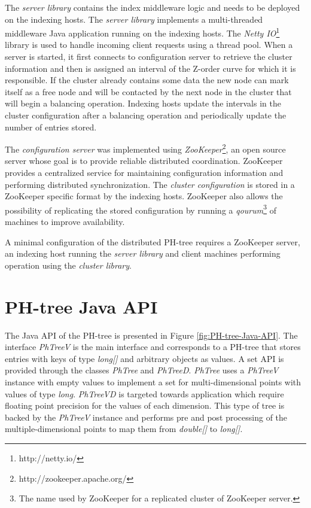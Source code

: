 \documentclass[11pt,a4paper]{globis-book}
\begin{document}
The \textit{server library} contains the index middleware logic and needs to be deployed on the indexing hosts. The \textit{server library} implements a multi-threaded middleware Java application running on the indexing hosts. The \textit{Netty IO}\footnote{http://netty.io/} library is used to handle incoming client requests using a thread pool. When a server is started, it first connects to configuration server to retrieve the cluster information and then is assigned an interval of the Z-order curve for which it is responsible. If the cluster already contains some data the new node can mark itself as a free node and will be contacted by the next node in the cluster that will begin a balancing operation. Indexing hosts update the intervals in the cluster configuration after a balancing operation and periodically update the number of entries stored. 

The \textit{configuration server} was implemented using \textit{ZooKeeper}\footnote{http://zookeeper.apache.org/}, an open source server whose goal is to provide reliable distributed coordination. ZooKeeper provides a centralized service for maintaining configuration information and performing distributed synchronization. The \textit{cluster configuration} is stored in a ZooKeeper specific format by the indexing hosts. ZooKeeper also allows the possibility of replicating the stored configuration by running a \textit{qourum}\footnote{The name used by ZooKeeper for a replicated cluster of ZooKeeper server.} of machines to improve availability. 

A minimal configuration of the distributed PH-tree requires a ZooKeeper server, an indexing host running the \textit{server library} and client machines performing operation using the \textit{cluster library}.

\section{PH-tree Java API}

The Java API of the PH-tree is presented in Figure \ref{fig:PH-tree-Java-API}. The interface \textit{PhTreeV} is the main interface and corresponds to a PH-tree that stores entries with keys of type \textit{long[]} and arbitrary objects as values. A set API is provided through the classes \textit{PhTree} and \textit{PhTreeD}. \textit{PhTree} uses a \textit{PhTreeV} instance with empty values to implement a set for multi-dimensional points with values of type \textit{long}. \textit{PhTreeVD} is targeted towards application which require floating point precision for the values of each dimension. This type of tree is backed by the \textit{PhTreeV} instance and performs pre and post processing of the multiple-dimensional points to map them from \textit{double[]} to \textit{long[]}.
\end{document}
